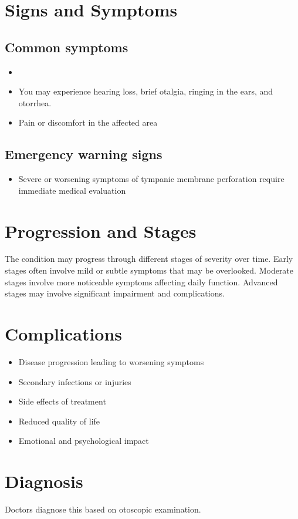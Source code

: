 \section{Signs and Symptoms}
\subsection{Common symptoms}
\begin{itemize}[noitemsep]
  \item \item You may experience hearing loss, brief otalgia, ringing in the ears, and otorrhea.
  \item Pain or discomfort in the affected area
  \end{itemize}
\subsection{Emergency warning signs}
\begin{itemize}[noitemsep]
  \item Severe or worsening symptoms of tympanic membrane perforation require immediate medical evaluation
\end{itemize}
\section{Progression and Stages}
The condition may progress through different stages of severity over time. Early stages often involve mild or subtle symptoms that may be overlooked. Moderate stages involve more noticeable symptoms affecting daily function. Advanced stages may involve significant impairment and complications.
\section{Complications}
\begin{itemize}[noitemsep]
  \item Disease progression leading to worsening symptoms
  \item Secondary infections or injuries
  \item Side effects of treatment
  \item Reduced quality of life
  \item Emotional and psychological impact
\end{itemize}
\section{Diagnosis}
Doctors diagnose this based on otoscopic examination.

